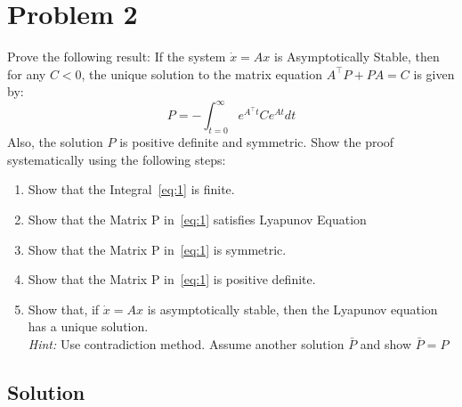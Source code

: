 \section*{Problem 2}

Prove the following result:
If the system \( \dot{x}=A x \) is Asymptotically Stable, then for any \( C<0 \), the unique solution to the matrix equation \( A^{\top} P+P A=C \) is given by:
\begin{equation*}\label{eq:1}
    P=-\int_{t=0}^{\infty} e^{A^{\top} t} C e^{A t} d t \tag{1}
\end{equation*}
Also, the solution \( P \) is positive definite and symmetric.
Show the proof systematically using the following steps:
\begin{enumerate}[label= (\alph*)]
    \item Show that the Integral~\ref{eq:1} is finite.
    \item Show that the Matrix P in~\ref{eq:1} satisfies Lyapunov Equation
    \item Show that the Matrix P in~\ref{eq:1} is symmetric.
    \item Show that the Matrix P in~\ref{eq:1} is positive definite.
    \item Show that, if \( \dot{x}=A x \) is asymptotically stable, then the Lyapunov equation has a unique solution. \\
          \textit{Hint:} Use contradiction method. Assume another solution \( \bar{P} \) and show \( \bar{P}=P \)
\end{enumerate}

\subsection*{Solution}
